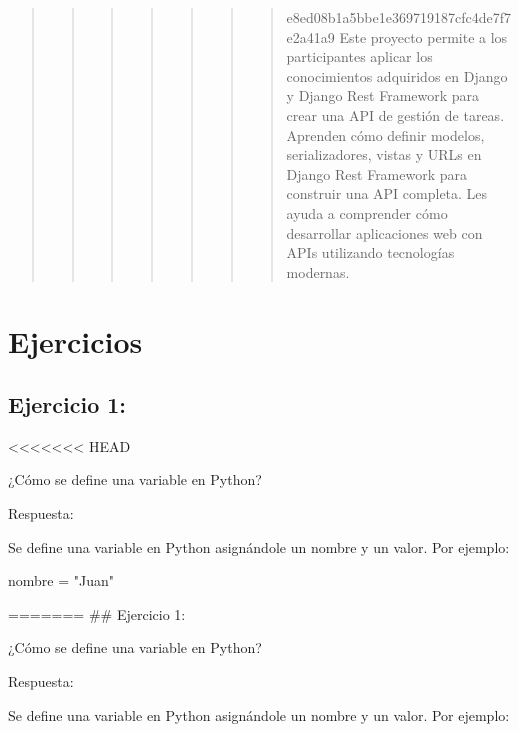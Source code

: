 \documentclass[
  a4paper,
  DIV=11,
  numbers=noendperiod,
  onepage,
  openany]{scrreprt}
\newenvironment{Shaded}{\begin{snugshade}}{\end{snugshade}}
\newcommand{\NormalTok}[1]{\textcolor[rgb]{0.00,0.23,0.31}{#1}}
\newcommand{\OperatorTok}[1]{\textcolor[rgb]{0.37,0.37,0.37}{#1}}
\newcommand{\StringTok}[1]{\textcolor[rgb]{0.13,0.47,0.30}{#1}}
\begin{document}
\begin{quote}
\begin{quote}
\begin{quote}
\begin{quote}
\begin{quote}
\begin{quote}
\begin{quote}
e8ed08b1a5bbe1e369719187cfc4de7f7e2a41a9 Este proyecto permite a los
participantes aplicar los conocimientos adquiridos en Django y Django
Rest Framework para crear una API de gestión de tareas. Aprenden cómo
definir modelos, serializadores, vistas y URLs en Django Rest Framework
para construir una API completa. Les ayuda a comprender cómo desarrollar
aplicaciones web con APIs utilizando tecnologías modernas.
\end{quote}
\end{quote}
\end{quote}
\end{quote}
\end{quote}
\end{quote}
\end{quote}

\part{Ejercicios}

\hypertarget{ejercicio-1}{%
\chapter{Ejercicio 1:}\label{ejercicio-1}}

\textless\textless\textless\textless\textless\textless\textless{} HEAD

¿Cómo se define una variable en Python?

Respuesta:

Se define una variable en Python asignándole un nombre y un valor. Por
ejemplo:

\begin{Shaded}
\begin{Highlighting}[]
\NormalTok{nombre }\OperatorTok{=} \StringTok{"Juan"}
\end{Highlighting}
\end{Shaded}

======= \#\# Ejercicio 1:

¿Cómo se define una variable en Python?

Respuesta:

Se define una variable en Python asignándole un nombre y un valor. Por
ejemplo:
\end{document}
